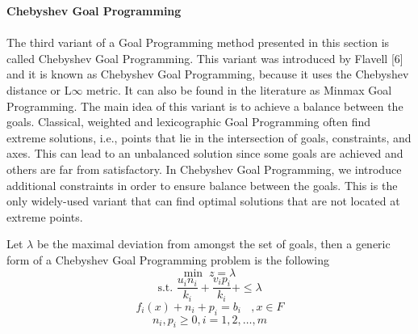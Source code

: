 \documentclass[a4paper, 12pt]{article}
\numberwithin{lemma}{section}
\begin{document}
		\newpage
		\textbf{Chebyshev Goal Programming}
		\\\\
		The third variant of a Goal Programming method presented in this section is called
		Chebyshev Goal Programming. This variant was introduced by Flavell [6] and it is
		known as Chebyshev Goal Programming, because it uses the Chebyshev distance or L$\infty$ metric. It can also be found in the literature as Minmax Goal Programming. The main idea of this variant is to achieve a balance between the goals. Classical, weighted and lexicographic Goal Programming often find extreme solutions, i.e.,
		points that lie in the intersection of goals, constraints, and axes. This can lead to an unbalanced solution since some goals are achieved and others are far from satisfactory. In Chebyshev Goal Programming, we introduce additional constraints in order to ensure balance between the goals. This is the only widely-used variant that can find optimal solutions that are not located at extreme points.
		
		Let $\lambda$ be the maximal deviation from amongst the set of goals, then a generic
		form of a Chebyshev Goal Programming problem is the following
		$$\text{min } ~ z = \lambda$$
		$$\text{s.t. } \dfrac{u_in_i}{k_i}+\dfrac{v_ip_i}{k_i} + \leq \lambda$$
		$$f_i(x)+n_i+p_i = b_i~~~~, x\in F$$
		$$n_i,p_i \geq 0, i = 1,2,\dots,m$$
		
		\newpage
		
\end{document}
